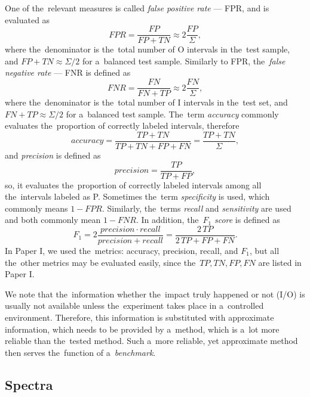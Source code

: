 One of the~relevant measures is called \textit{false positive rate} --- FPR, and is evaluated as 
\begin{equation}
    FPR = \frac{FP}{FP+TN} \approx 2 \frac{FP}{\Sigma},
\end{equation}
where the~denominator is the~total number of O intervals in the~test sample, and $FP+TN \approx \Sigma/2$ for a~balanced test sample. Similarly to FPR, the~\textit{false negative rate} --- FNR is defined as
\begin{equation}
    FNR = \frac{FN}{FN+TP} \approx 2 \frac{FN}{\Sigma},
\end{equation}
where the~denominator is the~total number of I intervals in the~test set, and $FN+TP \approx \Sigma/2$ for a~balanced test sample. The~term \textit{accuracy} commonly evaluates the~proportion of correctly labeled intervals, therefore
\begin{equation}
    accuracy = \frac{TP + TN}{TP + TN + FP + FN} = \frac{TP + TN}{\Sigma},
\end{equation}
and \textit{precision} is defined as
\begin{equation}
    precision = \frac{TP}{TP + FP},
\end{equation}
so, it evaluates the~proportion of correctly labeled intervals among all the~intervals labeled as P. Sometimes the~term \textit{specificity} is used, which commonly means $1-FPR$. Similarly, the~terms \textit{recall} and \textit{sensitivity} are used and both commonly mean $1-FNR$. In addition, the~$F_1$ \textit{score} is defined as
\begin{equation}
    F_1 = 2\frac{precision \cdot recall}{precision + recall} = \frac{2 \, TP}{2 \, TP + FP + FN}.
\end{equation}
In Paper I, we used the~metrics: accuracy, precision, recall, and $F_1$, but all the~other metrics may be evaluated easily, since the~$TP, TN, FP, FN$ are listed in Paper I. 

We note that the~information whether the~impact truly happened or not (I/O) is usually not available unless the~experiment takes place in a~controlled environment. Therefore, this information is substituted with approximate information, which needs to be provided by a~method, which is a~lot more reliable than the~tested method. Such a~more reliable, yet approximate method then serves the~function of a~\textit{benchmark}.

\subsection{Spectra}


